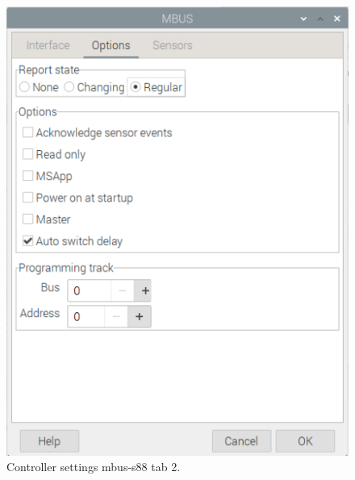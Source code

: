 \begin{figure}[h!]
	\centering
	\includegraphics[width=1.00\linewidth]{../figures/rocrailcontrollersettings/S88N_settings_tab2.png}
	\caption{Controller settings mbus-s88 tab 2.}
	\label{fig:S88N_settings_tab2}
\end{figure}

